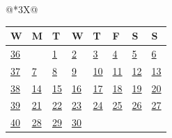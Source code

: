\begin{tabularx}{\linewidth}{@{}*{3}{X}@{}}
{{\begin{tabularx}{\linewidth}{Y|*{7}{Y}}
  W & M & T & W & T & F & S & S \\ \hline
  \hyperlink{Week 36}{36} &&\hyperlink{Week 36}{1}&\hyperlink{Week 36}{2}&\hyperlink{Week 36}{3}&\hyperlink{Week 36}{4}&\hyperlink{Week 36}{\textcolor{gray!60!black}{5}}&\hyperlink{Week 36}{\textcolor{red!70!black}{6}}\\ 
  \hyperlink{Week 37}{37} &\hyperlink{Week 37}{7}&\hyperlink{Week 37}{8}&\hyperlink{Week 37}{9}&\hyperlink{Week 37}{10}&\hyperlink{Week 37}{11}&\hyperlink{Week 37}{\textcolor{gray!60!black}{12}}&\hyperlink{Week 37}{\textcolor{red!70!black}{13}}\\ 
  \hyperlink{Week 38}{38} &\hyperlink{Week 38}{14}&\hyperlink{Week 38}{15}&\hyperlink{Week 38}{16}&\hyperlink{Week 38}{17}&\hyperlink{Week 38}{18}&\hyperlink{Week 38}{\textcolor{gray!60!black}{19}}&\hyperlink{Week 38}{\textcolor{red!70!black}{20}}\\ 
  \hyperlink{Week 39}{39} &\hyperlink{Week 39}{21}&\hyperlink{Week 39}{22}&\hyperlink{Week 39}{23}&\hyperlink{Week 39}{24}&\hyperlink{Week 39}{25}&\hyperlink{Week 39}{\textcolor{gray!60!black}{26}}&\hyperlink{Week 39}{\textcolor{red!70!black}{27}}\\ 
  \hyperlink{Week 40}{40} &\hyperlink{Week 40}{28}&\hyperlink{Week 40}{29}&\hyperlink{Week 40}{30}&&&&\\ 
  \end{tabularx}}
}
\end{tabularx} \vfill
